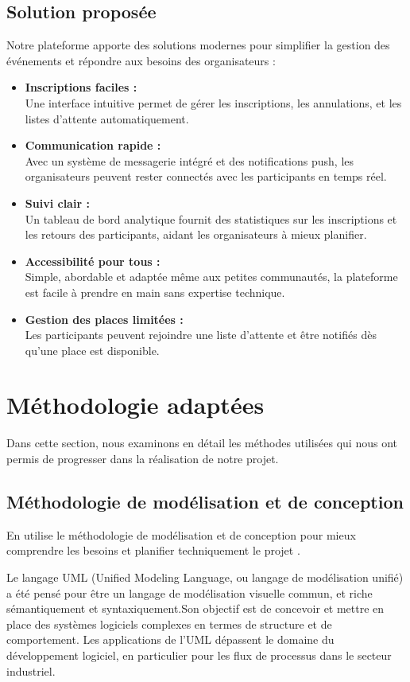 \subsection{Solution proposée}
Notre plateforme apporte des solutions modernes pour simplifier la gestion des événements et répondre aux besoins des organisateurs :
\begin{itemize}[label=$\star$]
  \item \textbf{Inscriptions faciles :} \\
  Une interface intuitive permet de gérer les inscriptions, les annulations, et les listes d’attente automatiquement.
  \item \textbf{Communication rapide :} \\
  Avec un système de messagerie intégré et des notifications push, les organisateurs peuvent rester connectés avec les participants en temps réel.
  \item \textbf{Suivi clair :} \\
  Un tableau de bord analytique fournit des statistiques sur les inscriptions et les retours des participants, aidant les organisateurs à mieux planifier.
  \item \textbf{Accessibilité pour tous :} \\
  Simple, abordable et adaptée même aux petites communautés, la plateforme est facile à prendre en main sans expertise technique.
  \item \textbf{Gestion des places limitées :} \\
  Les participants peuvent rejoindre une liste d’attente et être notifiés dès qu’une place est disponible.
\end{itemize}
\section {Méthodologie adaptées}
Dans cette section, nous examinons en détail les méthodes utilisées qui nous ont permis de progresser dans la réalisation de notre projet.
\subsection{Méthodologie de modélisation et de conception}
En utilise le méthodologie de modélisation et de conception  pour mieux comprendre les besoins et planifier techniquement le projet .

Le langage UML (Unified Modeling Language, ou langage de modélisation unifié) a été pensé pour être un langage de modélisation visuelle commun, et riche sémantiquement et syntaxiquement.Son objectif est de concevoir et mettre en place des systèmes logiciels complexes en termes de structure et de comportement. Les applications de l’UML dépassent le domaine du développement logiciel, en particulier pour les flux de processus dans le secteur industriel.\cite{ref1}
